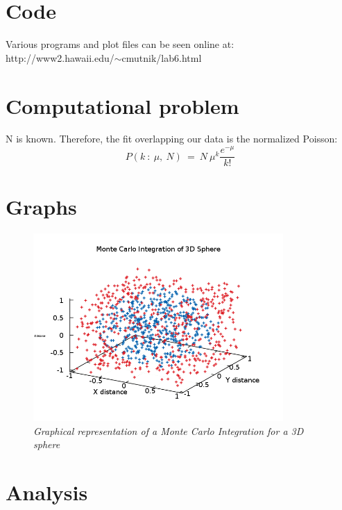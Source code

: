 \documentclass[11pt]{article}
\begin{document}
\section{Code}

Various programs and plot files can be seen online at: \\
http://www2.hawaii.edu/$\sim$cmutnik/lab6.html


\section{Computational problem}

N is known.  Therefore, the fit overlapping our data is the normalized Poisson:\\
\begin{equation}
\label{NormalizedP}
P(k~:~ \mu,~N) ~=~ N~ \mu^k \frac{e^{-\mu}}{k!}
\end{equation}

\section{Graphs}

\begin{figure}[H]
  \begin{center}
\centerline{\includegraphics[width=3.75in]{3dvol.png}}
\caption{\it \small{Graphical representation of a Monte Carlo Integration for a 3D sphere \label{fig1}}}
  \end{center}
\end{figure}






\section{Analysis}
\end{document}
